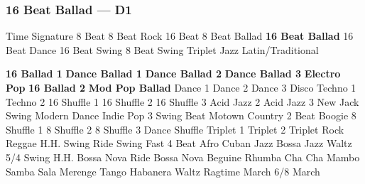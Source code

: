 \subsubsection[16 Beat Ballad]{16 Beat Ballad --- \UiKey{\II}\UiKey{\MET}D1}
Time Signature
8 Beat
8 Beat Rock
16 Beat
8 Beat Ballad
\textbf{16 Beat Ballad}
16 Beat Dance
16 Beat Swing
8 Beat Swing
Triplet
Jazz
Latin/Traditional





























\textbf{16 Ballad 1}
\textbf{Dance Ballad 1}
\textbf{Dance Ballad 2}
\textbf{Dance Ballad 3}
\textbf{Electro Pop}
\textbf{16 Ballad 2}
\textbf{Mod Pop Ballad}
Dance 1
Dance 2
Dance 3
Disco
Techno 1
Techno 2
16 Shuffle 1
16 Shuffle 2
16 Shuffle 3
Acid Jazz 2
Acid Jazz 3
New Jack Swing
Modern Dance
Indie Pop 3
Swing Beat
Motown
Country 2 Beat
Boogie
8 Shuffle 1
8 Shuffle 2
8 Shuffle 3
Dance Shuffle
Triplet 1
Triplet 2
Triplet Rock
Reggae
H.H. Swing
Ride Swing
Fast 4 Beat
Afro Cuban
Jazz Bossa
Jazz Waltz
5/4 Swing
H.H. Bossa Nova
Ride Bossa Nova
Beguine
Rhumba
Cha Cha
Mambo
Samba
Sala
Merenge
Tango
Habanera
Waltz
Ragtime
March
6/8 March
